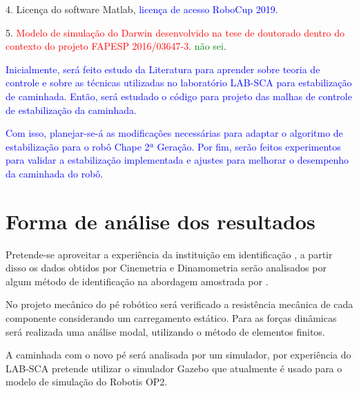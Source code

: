 4.	Licença do software Matlab, \textcolor{blue}{licença de acesso RoboCup 2019}.

5.	\textcolor{red}{Modelo de simulação do Darwin desenvolvido na tese de doutorado dentro do contexto do projeto FAPESP 2016/03647-3.} \textcolor{green}{não sei}.


\textcolor{blue}{Inicialmente, será feito estudo da Literatura para aprender sobre teoria de controle e sobre as técnicas utilizadas no laboratório LAB-SCA para estabilização de caminhada. Então, será estudado o código para projeto das malhas de controle de estabilização da caminhada.} 

\textcolor{blue}{Com isso, planejar-se-á as modificações necessárias para adaptar o algoritmo de estabilização para o robô Chape 2ª Geração. Por fim, serão feitos experimentos para validar a estabilização implementada e ajustes para melhorar o desempenho da caminhada do robô.}

\newpage





\section{Forma de análise dos resultados}

Pretende-se aproveitar a experiência da instituição em identificação \cite{gripp}, a partir disso os dados obtidos por Cinemetria e Dinamometria serão analisados por algum método de identificação na abordagem amostrada por \cite{ident2014,ident2017}.

No projeto mecânico do pé robótico será verificado a resistência mecânica de cada componente considerando um carregamento estático. Para as forças dinâmicas será realizada uma análise modal, utilizando o método de elementos finitos.

A caminhada com o novo pé será analisada por um simulador, por experiência do LAB-SCA pretende utilizar o simulador Gazebo que atualmente é usado para o modelo de simulação do Robotis OP2.

